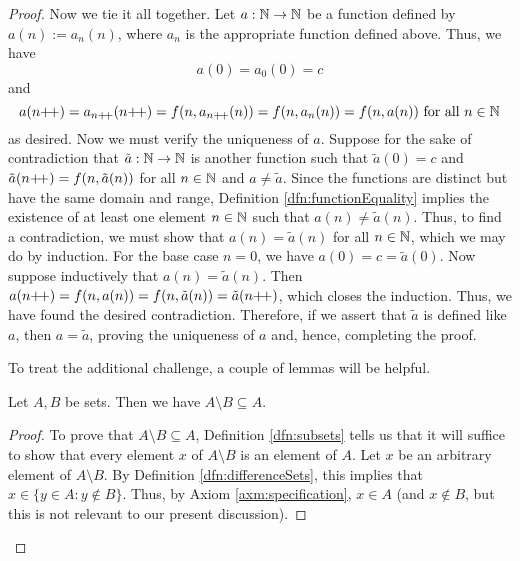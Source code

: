 \documentclass[../main.tex]{subfiles}
\begin{document}
\begin{enumerate}[ref={\thesection.\arabic*}]
\begin{proof}
        Now we tie it all together. Let $a:\mathbb{N}\to\mathbb{N}$ be a function defined by $a(n):=a_n(n)$, where $a_n$ is the appropriate function defined above. Thus, we have
        \begin{equation*}
            a(0) = a_0(0)
            = c
        \end{equation*}
        and
        \begin{equation*}
            a(n{+\!+}) = a_{n{+\!+}}(n{+\!+})
            = f(n,a_{n{+\!+}}(n))
            = f(n,a_n(n))
            = f(n,a(n))\text{ for all }n\in\mathbb{N}
        \end{equation*}
        as desired. Now we must verify the uniqueness of $a$. Suppose for the sake of contradiction that $\tilde{a}:\mathbb{N}\to\mathbb{N}$ is another function such that $\tilde{a}(0)=c$ and $\tilde{a}(n{+\!+})=f(n,\tilde{a}(n))$ for all $n\in\mathbb{N}$ and $a\neq\tilde{a}$. Since the functions are distinct but have the same domain and range, Definition \ref{dfn:functionEquality} implies the existence of at least one element $n\in\mathbb{N}$ such that $a(n)\neq\tilde{a}(n)$. Thus, to find a contradiction, we must show that $a(n)=\tilde{a}(n)$ for all $n\in\mathbb{N}$, which we may do by induction. For the base case $n=0$, we have $a(0)=c=\tilde{a}(0)$. Now suppose inductively that $a(n)=\tilde{a}(n)$. Then $a(n{+\!+})=f(n,a(n))=f(n,\tilde{a}(n))=\tilde{a}(n{+\!+})$, which closes the induction. Thus, we have found the desired contradiction. Therefore, if we assert that $\tilde{a}$ is defined like $a$, then $a=\tilde{a}$, proving the uniqueness of $a$ and, hence, completing the proof.\par
        \medskip
        To treat the additional challenge, a couple of lemmas will be helpful.
        \begin{lem}\label{lem:differenceSetsSubsets}
            Let $A,B$ be sets. Then we have $A\setminus B\subseteq A$.
            \begin{proof}
                To prove that $A\setminus B\subseteq A$, Definition \ref{dfn:subsets} tells us that it will suffice to show that every element $x$ of $A\setminus B$ is an element of $A$. Let $x$ be an arbitrary element of $A\setminus B$. By Definition \ref{dfn:differenceSets}, this implies that $x\in\{y\in A:y\notin B\}$. Thus, by Axiom \ref{axm:specification}, $x\in A$ (and $x\notin B$, but this is not relevant to our present discussion).
            \end{proof}
        \end{lem}
        \begin{lem}\label{lem:unionSubsetsNeq}

\end{lem}
\end{proof}
\end{enumerate}
\end{document}
